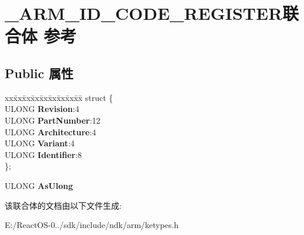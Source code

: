 \hypertarget{union___a_r_m___i_d___c_o_d_e___r_e_g_i_s_t_e_r}{}\section{\+\_\+\+A\+R\+M\+\_\+\+I\+D\+\_\+\+C\+O\+D\+E\+\_\+\+R\+E\+G\+I\+S\+T\+E\+R联合体 参考}
\label{union___a_r_m___i_d___c_o_d_e___r_e_g_i_s_t_e_r}
\subsection*{Public 属性}
\begin{DoxyCompactItemize}
\item 
\mbox{\label{union___a_r_m___i_d___c_o_d_e___r_e_g_i_s_t_e_r_aa6ceb32b43c0015b5a4c732f533254f9}} 
\begin{tabbing}
xx\=xx\=xx\=xx\=xx\=xx\=xx\=xx\=xx\=\kill
struct \{\\
\>ULONG {\bfseries Revision}:4\\
\>ULONG {\bfseries PartNumber}:12\\
\>ULONG {\bfseries Architecture}:4\\
\>ULONG {\bfseries Variant}:4\\
\>ULONG {\bfseries Identifier}:8\\
\}; \\

\end{tabbing}\item 
\mbox{\label{union___a_r_m___i_d___c_o_d_e___r_e_g_i_s_t_e_r_a6c3ffc397df6a76464a94d7730e8862f}} 
U\+L\+O\+NG {\bfseries As\+Ulong}
\end{DoxyCompactItemize}


该联合体的文档由以下文件生成\+:\begin{DoxyCompactItemize}
\item 
E\+:/\+React\+O\+S-\/0../sdk/include/ndk/arm/ketypes.\+h\end{DoxyCompactItemize}
